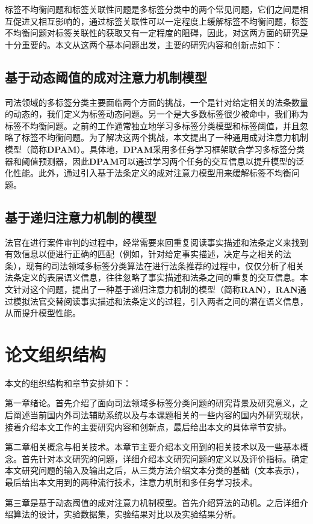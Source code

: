 标签不均衡问题和标签关联性问题是多标签分类中的两个常见问题，它们之间是相互促进又相互影响的，通过标签关联性可以一定程度上缓解标签不均衡问题，标签不均衡问题对标签关联性的获取又有一定程度的阻碍，因此，对这两方面的研究是十分重要的。本文从这两个基本问题出发，主要的研究内容和创新点如下：

\subsection{基于动态阈值的成对注意力机制模型}
司法领域的多标签分类主要面临两个方面的挑战，一个是针对给定相关的法条数量的动态的，我们定义为标签动态问题。另一个是大多数标签很少被命中，我们称为标签不均衡问题。之前的工作通常独立地学习多标签分类模型和标签阈值，并且忽略了标签不均衡问题。为了解决这两个挑战，本文提出了一种通用成对注意力机制模型（简称\textbf{DPAM}）。具体地，\textbf{DPAM}采用多任务学习框架联合学习多标签分类器和阈值预测器，因此\textbf{DPAM}可以通过学习两个任务的交互信息以提升模型的泛化性能。此外，通过引入基于法条定义的成对注意力模型用来缓解标签不均衡问题。

\subsection{基于递归注意力机制的模型}
法官在进行案件审判的过程中，经常需要来回重复阅读事实描述和法条定义来找到有效信息以便进行正确的匹配（例如，针对给定事实描述，决定与之相关的法条），现有的司法领域多标签分类算法在进行法条推荐的过程中，仅仅分析了相关法条定义的表层语义信息，往往忽略了事实描述和法条之间的重复的交互信息。本文针对这个问题，提出了一种基于递归注意力机制的模型（简称\textbf{RAN}），\textbf{RAN}通过模拟法官交替阅读事实描述和法条定义的过程，引入两者之间的潜在语义信息，从而提升模型性能。
\section{论文组织结构}
本文的组织结构和章节安排如下：

第一章绪论。首先介绍了面向司法领域多标签分类问题的研究背景及研究意义，之后阐述当前国内外司法辅助系统以及与本课题相关的一些内容的国内外研究现状，接着介绍本文工作的主要研究内容和创新点，最后给出本文的具体章节安排。

第二章相关概念与相关技术。本章节主要介绍本文用到的相关技术以及一些基本概念。首先针对本文研究的问题，详细介绍本文研究问题的定义以及评价指标。确定本文研究问题的输入及输出之后，从三类方法介绍文本分类的基础（文本表示），最后给出本文用到的两种流行技术，注意力机制和多任务学习技术。

第三章是基于动态阈值的成对注意力机制模型。首先介绍算法的动机。之后详细介绍算法的设计，实验数据集，实验结果对比以及实验结果分析。

